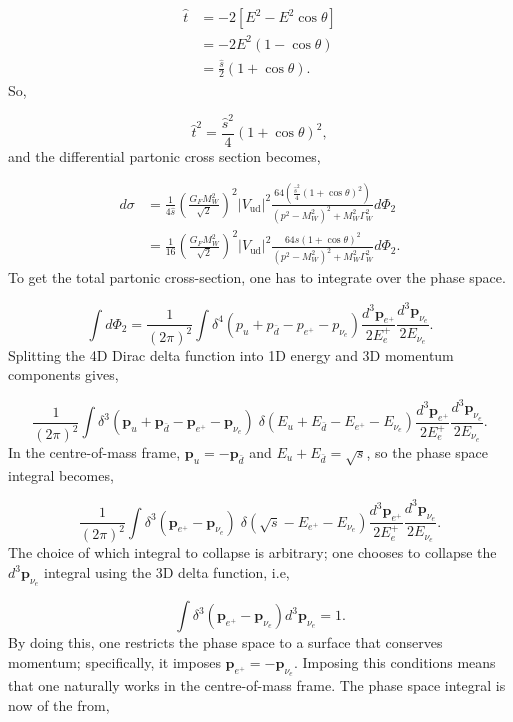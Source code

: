 \documentclass[a4paper,11pt]{article}
\begin{document}
\begin{equation*}
	\begin{aligned}
		\hat{t} &= -2\left[E^2 - E^2\cos\theta \right] \\
		&= -2E^2(1-\cos\theta)\\
		&=\frac{\hat{s}}{2} (1+ \cos\theta).
	\end{aligned}
\end{equation*}
So, 

$$\hat{t}^2 = \frac{\hat{s}^2}{4} (1+ \cos\theta)^2,$$
and the differential partonic cross section becomes,

\begin{equation*}
	\begin{aligned}
			d\sigma  &=  \frac{1}{4\hat{s}}\left(\frac{G_FM_W^2}{\sqrt{2}}\right)^2|V_\text{ud}|^2 \frac{64 (\frac{\hat{s}^2}{4} (1+ \cos\theta)^2)}{(p^2-M_W^2)^2 +M_W^2\Gamma_W^2}d\Phi_{2} \\
			&= \frac{1}{16}\left(\frac{G_FM_W^2}{\sqrt{2}}\right)^2|V_\text{ud}|^2 \frac{64\hat{s}(1+ \cos\theta)^2}{(p^2-M_W^2)^2 +M_W^2\Gamma_W^2}d\Phi_{2}.
	\end{aligned}
\end{equation*}
 To get the total partonic cross-section, one has to integrate over the phase space.
 
 $$\int d\Phi_{2} = \frac{1}{(2\pi)^2} \int  \delta^4(p_u +p_{\bar{d}} - p_{e^+} - p_{\nu_e}) \frac{d^3\boldsymbol{p}_{e^+}}{2E_e^+} \frac{d^3\boldsymbol{p}_{\nu_e}}{2E_{\nu_e}}.  $$
Splitting the 4D Dirac delta function into 1D energy and 3D momentum components gives,

$$
\frac{1}{(2\pi)^2} \int  \delta^3(\boldsymbol{p}_u + \boldsymbol{p}_{\bar{d}} - \boldsymbol{p}_{e^+} - \boldsymbol{p}_{\nu_e})\; \delta(E_u + E_{\bar{d}}- E_{e^+}- E_{\nu_e} )   \frac{d^3\boldsymbol{p}_{e^+}}{2E_e^+} \frac{d^3\boldsymbol{p}_{\nu_e}}{2E_{\nu_e}}. 
$$
In the centre-of-mass frame, $\boldsymbol{p}_u= -\boldsymbol{p}_{\bar{d}}$ and $E_u + E_{\bar{d}} = \sqrt{s}$, so the phase space integral becomes,


$$
\frac{1}{(2\pi)^2} \int  \delta^3(\boldsymbol{p}_{e^+} - \boldsymbol{p}_{\nu_e})\; \delta(\sqrt{s}- E_{e^+}- E_{\nu_e} )   \frac{d^3\boldsymbol{p}_{e^+}}{2E_e^+} \frac{d^3\boldsymbol{p}_{\nu_e}}{2E_{\nu_e}}.
$$
The choice of which integral to collapse is arbitrary; one chooses to collapse the $d^3\boldsymbol{p}_{\nu_e}$ integral using the 3D delta function, i.e,

$$ \int \delta^3(\boldsymbol{p}_{e^+} - \boldsymbol{p}_{\nu_e})d^3\boldsymbol{p}_{\nu_e}  =1. $$
By doing this, one restricts the phase space to a surface that conserves momentum; specifically, it imposes $\boldsymbol{p}_{e^+} =  - \boldsymbol{p}_{\nu_e}$. Imposing this conditions means that one naturally works in the centre-of-mass frame. The phase space integral is now of the from,
\end{document}
